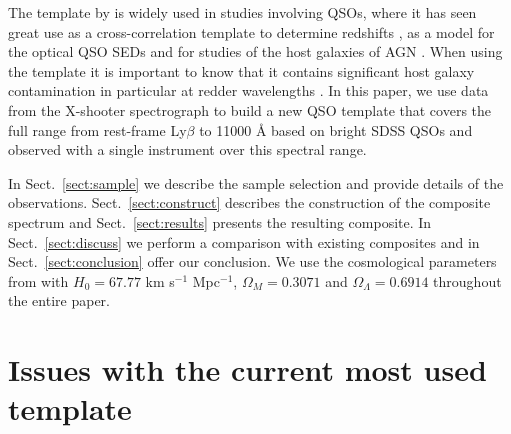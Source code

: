 \documentclass{aa}    %
\newcommand{\sectionname}{Sect.}
\newcommand{\Sect}[1]{\sectionname~\ref{sect:#1}}
\newcommand{\sect}[1]{\Sect{#1}}
\newcommand{\sectlabel}[1]{\label{sect:#1}}
\begin{document}
The template by \citet{VandenBerk2001} is widely used in studies
involving QSOs, where it has seen great use as a cross-correlation
template to determine redshifts \citep{Stoughton2002, Rafiee2011}, as
a model for the optical QSO SEDs \citep{Croom2004, Hopkins2006,
  Hopkins2007} and for studies of the host galaxies of AGN
\citep{Kauffmann2003b}. When using the \citet{VandenBerk2001} template
it is important to know that it contains significant host galaxy
contamination in particular at redder wavelengths \citep[e.g.,][their
  Fig.~5]{Fynbo2013}.  In this paper, we use data from the X-shooter
spectrograph to build a new QSO template that covers the full range
from rest-frame Ly$\beta$ to 11000 {\AA} based on bright SDSS QSOs and
observed with a single instrument over this spectral range. 

In \sect{sample} we describe the sample selection and provide details
of the observations. \sect{construct} describes the construction of
the composite spectrum and \sect{results} presents the resulting
composite. In \sect{discuss} we perform a comparison with existing
composites and in \sect{conclusion} offer our conclusion. We use the
cosmological parameters from \citet{Planck2014} with $H_{0} = 67.77$
km s$^{-1}$ Mpc$^{-1}$, $\Omega_{M} = 0.3071$ and $\Omega_{\Lambda} =
0.6914$ throughout the entire paper.




\section{Issues with the current most used template}   \sectlabel{problem}
\end{document}
